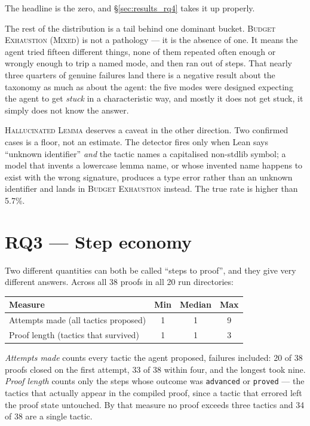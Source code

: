 The headline is the zero, and \S\ref{sec:results_rq4} takes it up properly.

The rest of the distribution is a tail behind one dominant bucket.
\textsc{Budget Exhaustion (Mixed)} is not a pathology --- it is the absence of one.
It means the agent tried fifteen different things, none of them repeated often
enough or wrongly enough to trip a named mode, and then ran out of steps.
That nearly three quarters of genuine failures land there is a negative result
about the taxonomy as much as about the agent: the five modes were designed
expecting the agent to get \emph{stuck} in a characteristic way, and mostly it
does not get stuck, it simply does not know the answer.

\textsc{Hallucinated Lemma} deserves a caveat in the other direction.
Two confirmed cases is a floor, not an estimate.
The detector fires only when Lean says ``unknown identifier'' \emph{and} the
tactic names a capitalised non-stdlib symbol; a model that invents a lowercase
lemma name, or whose invented name happens to exist with the wrong signature,
produces a type error rather than an unknown identifier and lands in
\textsc{Budget Exhaustion} instead. The true rate is higher than 5.7\%.

\section{RQ3 --- Step economy}
\label{sec:results_rq3}

Two different quantities can both be called ``steps to proof'', and they give
very different answers. Across all 38 proofs in all 20 run directories:

\begin{center}
\begin{tabular}{@{}lccc@{}}
\hline
\textbf{Measure} & \textbf{Min} & \textbf{Median} & \textbf{Max} \\
\hline
Attempts made (all tactics proposed)     & 1 & 1 & 9 \\
Proof length (tactics that survived)     & 1 & 1 & 3 \\
\hline
\end{tabular}
\end{center}

\emph{Attempts made} counts every tactic the agent proposed, failures included:
20 of 38 proofs closed on the first attempt, 33 of 38 within four, and the
longest took nine.
\emph{Proof length} counts only the steps whose outcome was \texttt{advanced} or
\texttt{proved} --- the tactics that actually appear in the compiled proof, since
a tactic that errored left the proof state untouched.
By that measure no proof exceeds three tactics and 34 of 38 are a single tactic.

